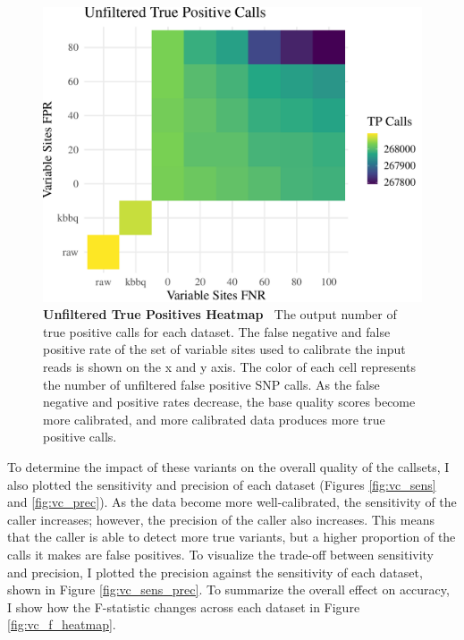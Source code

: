 \documentclass{report}
\newcommand{\titlecaption}[2]{\caption[#1]{\textbf{#1 \textbar\,} #2}}
\begin{document}
\begin{figure}
\centering
\includegraphics[width = .7\textwidth]{tp_heatmap.pdf}
\titlecaption{Unfiltered True Positives Heatmap}{The output number of true positive calls for each dataset. The false negative and false positive rate of the set of variable sites used to calibrate the input reads is shown on the x and y axis. The color of each cell represents the number of unfiltered false positive SNP calls. As the false negative and positive rates decrease, the base quality scores become more calibrated, and more calibrated data produces more true positive calls.}
\label{fig:vc_tph}
\end{figure}

\begin{outline}
\item To determine the impact of these variants on the overall quality of the callsets, I also plotted the sensitivity and precision of each dataset (Figures \ref{fig:vc_sens} and \ref{fig:vc_prec}). As the data become more well-calibrated, the sensitivity of the caller increases; however, the precision of the caller also increases. This means that the caller is able to detect more true variants, but a higher proportion of the calls it makes are false positives. To visualize the trade-off between sensitivity and precision, I plotted the precision against the sensitivity of each dataset, shown in Figure \ref{fig:vc_sens_prec}. To summarize the overall effect on accuracy, I show how the F-statistic changes across each dataset in Figure \ref{fig:vc_f_heatmap}.
\end{outline}
\end{document}
